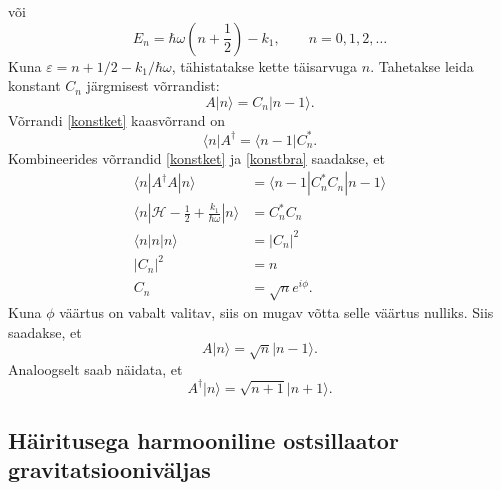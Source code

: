 \documentclass{trkut}%
\renewcommand\bra[1]{{\langle{#1}|}}
\renewcommand\ket[1]{{|{#1}\rangle}}
\renewcommand\braket[1]{\langle{#1}\rangle}
\begin{document}
või
\begin{equation}
    E_n=\hbar \omega \left(n+\frac{1}{2}\right)-k_1, \qquad n=0, 1, 2,\dots
    \label{nullenergia}
\end{equation}
Kuna $\varepsilon=n+1/2 - k_1/\hbar \omega$, tähistatakse kette täisarvuga $n$.
Tahetakse leida konstant $C_n$ järgmisest võrrandist:
\begin{equation}
    A\ket{n}=C_n \ket{n -1}.
    \label{konstket}
\end{equation}
Võrrandi \eqref{konstket} kaasvõrrand on
\begin{equation}
    \bra{n}A^\dagger=\bra{n-1}C_n^*.
    \label{konstbra}
\end{equation}
Kombineerides võrrandid \eqref{konstket} ja \eqref{konstbra} saadakse, et
\begin{align}
    \braket{n|A^\dagger A|n}&=\braket{n-1|C_n^* C_n| n-1} \\
    \braket{n|\mathcal{H}-\tfrac{1}{2}+\tfrac{k_1}{\hbar \omega}|n}&=C_n^* C_n \\
    \braket{n|n|n}&=|C_n|^2 \\
    |C_n|^2&=n \\
    C_n&=\sqrt{n} e^{i\phi}.
\end{align}
Kuna $\phi$ väärtus on vabalt valitav, siis on mugav võtta selle väärtus nulliks. Siis saadakse, et
\begin{equation}
    A\ket{n}=\sqrt{n}\ket{n-1}.
\end{equation}
Analoogselt saab näidata, et
\begin{equation}
    A^\dagger \ket{n}=\sqrt{n+1}\ket{n+1}.
\end{equation}

\subsection{Häiritusega harmooniline ostsillaator gravitatsiooniväljas}
\end{document}
